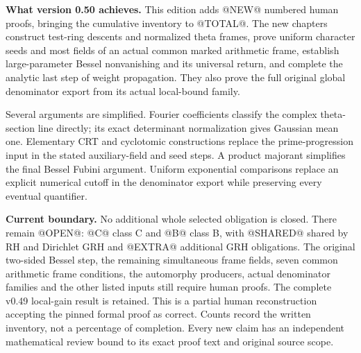 \textbf{What version 0.50 achieves.}
This edition adds @NEW@ numbered human proofs, bringing the cumulative
inventory to @TOTAL@. The new chapters construct test-ring descents and
normalized theta frames, prove uniform character seeds and most fields
of an actual common marked arithmetic frame, establish large-parameter
Bessel nonvanishing and its universal return, and complete the analytic
last step of weight propagation. They also prove the full original
global denominator export from its actual local-bound family.

Several arguments are simplified. Fourier coefficients classify the
complex theta-section line directly; its exact determinant normalization
gives Gaussian mean one. Elementary CRT and cyclotomic constructions
replace the prime-progression input in the stated auxiliary-field and
seed steps. A product majorant simplifies the final Bessel Fubini
argument. Uniform exponential comparisons replace an explicit numerical
cutoff in the denominator export while preserving every eventual
quantifier.

\textbf{Current boundary.}
No additional whole selected obligation is closed. There remain @OPEN@:
@C@ class C and @B@ class B, with @SHARED@ shared by RH and Dirichlet GRH
and @EXTRA@ additional GRH obligations. The original two-sided Bessel
step, the remaining simultaneous frame fields, seven common arithmetic
frame conditions, the automorphy producers, actual denominator families
and the other listed inputs still require human proofs. The complete
v0.49 local-gain result is retained.
This is a partial human reconstruction accepting the pinned formal
proof as correct. Counts record the written inventory, not a percentage
of completion. Every new claim has an independent mathematical review
bound to its exact proof text and original source scope.

